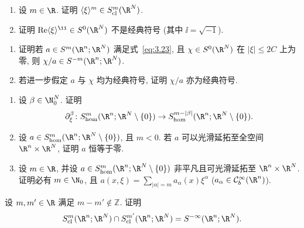 \begin{exer}[符号与经典符号]\label{ex:3.3}
\begin{enumerate}
    \item 设 $m \in \R$. 证明 $\langle \xi \rangle^m \in S_{\mathrm{cl}}^m(\R^N)$.
    \item 证明 $\operatorname{Re} \langle \xi \rangle^\ii \in S^0(\R^N)$ 不是经典符号 (其中 $\ii = \sqrt{-1}$).
\end{enumerate}
\end{exer}

\begin{exer}[椭圆符号的拟逆]\label{ex:3.4}
\begin{enumerate}
    \item 证明若 $a \in S^m(\R^n; \R^N)$ 满足式~\eqref{eq:3.23}, 且 $\chi \in S^0(\R^N)$ 在 $|\xi| \le 2C$ 上为零, 则 $\chi / a \in S^{-m}(\R^n; \R^N)$.
    \item 若进一步假定 $a$ 与 $\chi$ 均为经典符号, 证明 $\chi / a$ 亦为经典符号.
\end{enumerate}
\end{exer}

\begin{exer}[光滑齐次符号与多项式]\label{ex:3.5}
\begin{enumerate}
    \item 设 $\beta \in \N_0^N$. 证明
    \begin{equation}\label{eq:3.65}
        \partial_\xi^\beta \colon S_{\mathrm{hom}}^m(\R^n; \R^N \setminus \{0\}) \to S_{\mathrm{hom}}^{m - |\beta|}(\R^n; \R^N \setminus \{0\}).
    \end{equation}
    \item 设 $a \in S_{\mathrm{hom}}^m(\R^n; \R^N \setminus \{0\})$, 且 $m < 0$. 若 $a$ 可以光滑延拓至全空间 $\R^n \times \R^N$, 证明 $a$ 恒等于零.
    \item 设 $m \in \R$, 并设 $a \in S_{\mathrm{hom}}^m(\R^n; \R^N \setminus \{0\})$ 非平凡且可光滑延拓至 $\R^n \times \R^N$. 证明必有 $m \in \N_0$, 且 $a(x, \xi) = \sum_{|\alpha| = m} a_\alpha(x) \xi^\alpha$ ($a_\alpha \in \mathcal{C}_b^\infty(\R^n)$).
\end{enumerate}
\end{exer}

\begin{exer}[不同阶经典符号空间的交集]\label{ex:3.6}
设 $m, m' \in \R$ 满足 $m - m' \notin \mathbb{Z}$. 证明
\[
    S_{\mathrm{cl}}^m(\R^n; \R^N) \cap S_{\mathrm{cl}}^{m'}(\R^n; \R^N) = S^{-\infty}(\R^n; \R^N).
\]
\end{exer}

